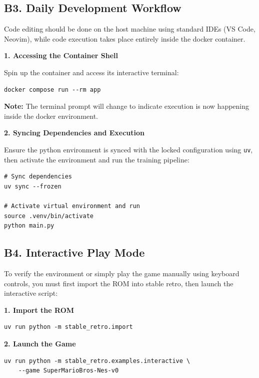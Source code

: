 \subsection*{B3. Daily Development Workflow}

Code editing should be done on the host machine using standard IDEs (VS Code,
Neovim), while code execution takes place entirely inside the docker container.

\noindent
\textbf{1. Accessing the Container Shell}

\noindent
Spin up the container and access its interactive terminal:

\begin{lstlisting}
docker compose run --rm app
\end{lstlisting}

\noindent
\textbf{Note:} The terminal prompt will change to indicate execution is now
happening inside the docker environment.

\noindent
\textbf{2. Syncing Dependencies and Execution}

\noindent
Ensure the python environment is synced with the locked configuration using
\texttt{uv}, then activate the environment and run the training pipeline:

\begin{lstlisting}
# Sync dependencies
uv sync --frozen

# Activate virtual environment and run
source .venv/bin/activate
python main.py
\end{lstlisting}

\subsection*{B4. Interactive Play Mode}

To verify the environment or simply play the game manually using keyboard
controls, you must first import the ROM into stable retro, then launch the
interactive script:

\noindent
\textbf{1. Import the ROM}

\begin{lstlisting}
uv run python -m stable_retro.import
\end{lstlisting}

\noindent
\textbf{2. Launch the Game}

\begin{lstlisting}
uv run python -m stable_retro.examples.interactive \
    --game SuperMarioBros-Nes-v0
\end{lstlisting}
